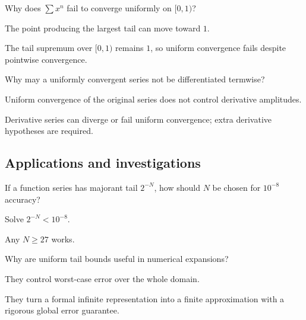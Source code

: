 \begin{exercise}\label{exr:ii13-expand-11}
Why does \(\sum x^n\) fail to converge uniformly on \([0,1)\)?
\end{exercise}
\begin{hint}
The point producing the largest tail can move toward \(1\).
\end{hint}
\begin{solution}
The tail supremum over \([0,1)\) remains \(1\), so uniform convergence fails despite pointwise convergence.
\end{solution}

\begin{exercise}\label{exr:ii13-expand-12}
Why may a uniformly convergent series not be differentiated termwise?
\end{exercise}
\begin{hint}
Uniform convergence of the original series does not control derivative amplitudes.
\end{hint}
\begin{solution}
Derivative series can diverge or fail uniform convergence; extra derivative hypotheses are required.
\end{solution}

\subsection*{Applications and investigations}

\begin{exercise}\label{exr:ii13-expand-13}
If a function series has majorant tail \(2^{-N}\), how should \(N\) be chosen for \(10^{-8}\) accuracy?
\end{exercise}
\begin{hint}
Solve \(2^{-N}<10^{-8}\).
\end{hint}
\begin{solution}
Any \(N\ge27\) works.
\end{solution}

\begin{exercise}\label{exr:ii13-expand-14}
Why are uniform tail bounds useful in numerical expansions?
\end{exercise}
\begin{hint}
They control worst-case error over the whole domain.
\end{hint}
\begin{solution}
They turn a formal infinite representation into a finite approximation with a rigorous global error guarantee.
\end{solution}

